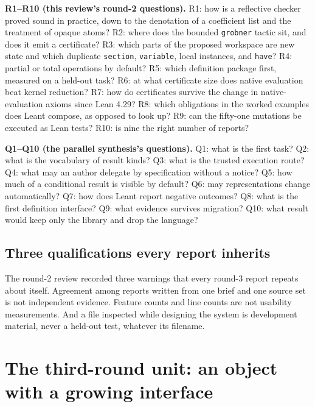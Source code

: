 \documentclass[11pt,a4paper]{article}
\newcommand{\code}[1]{\nolinkurl{#1}}
\theoremstyle{definition}
\begin{document}
\begin{keybox}
\textbf{R1--R10 (this review's round-2 questions).} R1: how is a reflective checker proved sound in practice, down to the denotation of a coefficient list and the treatment of opaque atoms? R2: where does the bounded \code{grobner} tactic sit, and does it emit a certificate? R3: which parts of the proposed workspace are new state and which duplicate \code{section}, \code{variable}, local instances, and \code{have}? R4: partial or total operations by default? R5: which definition package first, measured on a held-out task? R6: at what certificate size does native evaluation beat kernel reduction? R7: how do certificates survive the change in native-evaluation axioms since Lean 4.29? R8: which obligations in the worked examples does Leant compose, as opposed to look up? R9: can the fifty-one mutations be executed as Lean tests? R10: is nine the right number of reports?

\textbf{Q1--Q10 (the parallel synthesis's questions).} Q1: what is the first task? Q2: what is the vocabulary of result kinds? Q3: what is the trusted execution route? Q4: what may an author delegate by specification without a notice? Q5: how much of a conditional result is visible by default? Q6: may representations change automatically? Q7: how does Leant report negative outcomes? Q8: what is the first definition interface? Q9: what evidence survives migration? Q10: what result would keep only the library and drop the language?
\end{keybox}

\subsection{Three qualifications every report inherits}
The round-2 review recorded three warnings that every round-3 report repeats about itself. Agreement among reports written from one brief and one source set is not independent evidence. Feature counts and line counts are not usability measurements. And a file inspected while designing the system is development material, never a held-out test, whatever its filename.

\section{The third-round unit: an object with a growing interface}\label{sec:unit}
\end{document}
